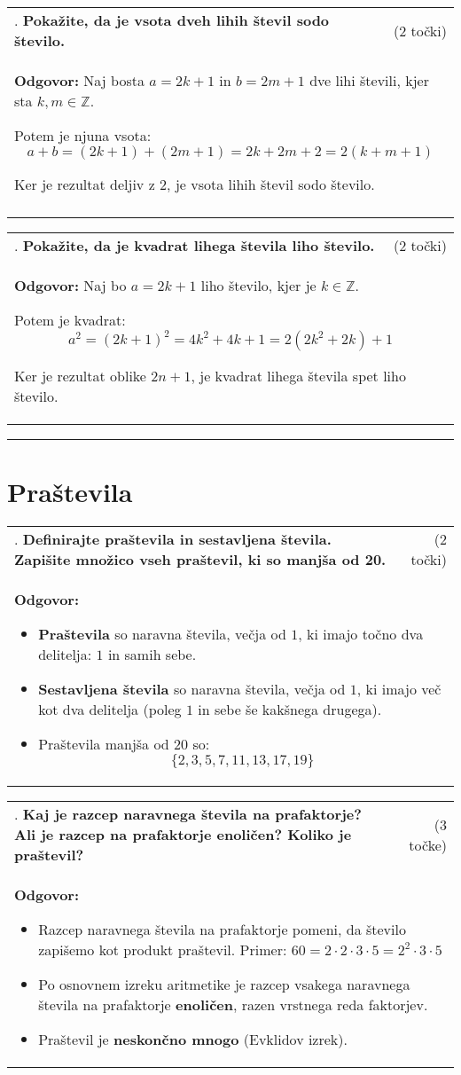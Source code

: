 \documentclass[12pt]{article}
\newcounter{vprasanje}[section]
\renewcommand{\thevprasanje}{\roman{vprasanje}}
\newcommand{\vprasanje}[2]{%
  \stepcounter{vprasanje}%
  \textbf{\thevprasanje}. \textbf{#1} & (#2) \\
}
\newcommand{\odgovor}[1]{%
  \multicolumn{2}{p{\dimexpr\textwidth-2\tabcolsep\relax}}{%
    \small \textbf{Odgovor:} #1%
  } \\[1em]%
}
\newcommand{\crta}{\rule{\textwidth}{0.4pt}}
\newcommand{\naslov}[1]{%
  \vspace{1em} 
  \section{#1}
  \addcontentsline{toc}{section}{\protect\numberline{}#1}%
}
\newcommand{\razmak}[1]{%
  \vspace{#1}
}
\begin{document}
\begin{tabularx}{\textwidth}{X r}
\vprasanje{Pokažite, da je vsota dveh lihih števil sodo število.}{2 točki}
\odgovor{%
Naj bosta $a = 2k + 1$ in $b = 2m + 1$ dve lihi števili, kjer sta $k, m \in \mathbb{Z}$.

Potem je njuna vsota:
\[
a + b = (2k + 1) + (2m + 1) = 2k + 2m + 2 = 2(k + m + 1)
\]

Ker je rezultat deljiv z $2$, je vsota lihih števil sodo število.
}

\razmak{1em}

\end{tabularx}

\begin{tabularx}{\textwidth}{X r}
\vprasanje{Pokažite, da je kvadrat lihega števila liho število.}{2 točki}
\odgovor{%
Naj bo $a = 2k + 1$ liho število, kjer je $k \in \mathbb{Z}$.

Potem je kvadrat:
\[
a^2 = (2k + 1)^2 = 4k^2 + 4k + 1 = 2(2k^2 + 2k) + 1
\]

Ker je rezultat oblike $2n + 1$, je kvadrat lihega števila spet liho število.
}
\end{tabularx}
\razmak{0.5em}


\crta

\naslov{Praštevila}

\begin{tabularx}{\textwidth}{X r}
\vprasanje{Definirajte praštevila in sestavljena števila. Zapišite množico vseh praštevil, ki so manjša od 20.}{2 točki}
\odgovor{%
\begin{itemize}
	\item \textbf{Praštevila} so naravna števila, večja od $1$, ki imajo točno dva delitelja: $1$ in samih sebe.

	\item \textbf{Sestavljena števila} so naravna števila, večja od $1$, ki imajo več kot dva delitelja (poleg $1$ in sebe še kakšnega drugega).

	\item Praštevila manjša od $20$ so:
$$\{2, 3, 5, 7, 11, 13, 17, 19\}$$
\end{itemize}
}
\end{tabularx}

\begin{tabularx}{\textwidth}{X r}
\vprasanje{Kaj je razcep naravnega števila na prafaktorje? Ali je razcep na prafaktorje enoličen? Koliko je praštevil?}{3 točke}
\odgovor{%
\begin{itemize}
	\item Razcep naravnega števila na prafaktorje pomeni, da število zapišemo kot produkt praštevil. Primer: $60 = 2 \cdot 2 \cdot 3 \cdot 5 = 2^2 \cdot 3 \cdot 5$

	\item Po osnovnem izreku aritmetike je razcep vsakega naravnega števila na prafaktorje \textbf{enoličen}, razen vrstnega reda faktorjev.

	\item Praštevil je \textbf{neskončno mnogo} (Evklidov izrek).
\end{itemize}
}
\end{tabularx}
\end{document}
